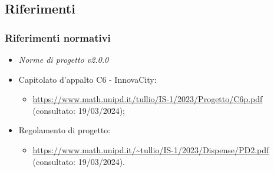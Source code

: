 \subsection{Riferimenti}

\subsubsection{Riferimenti normativi}
\begin{itemize}
    \item \textit{Norme di progetto v2.0.0}
    \item Capitolato d'appalto C6 - InnovaCity:
    \begin{itemize}
        \item \url{https://www.math.unipd.it/tullio/IS-1/2023/Progetto/C6p.pdf} (consultato: 19/03/2024);
    \end{itemize}
    \item Regolamento di progetto:
    \begin{itemize}
        \item \url{https://www.math.unipd.it/~tullio/IS-1/2023/Dispense/PD2.pdf} (consultato: 19/03/2024).
    \end{itemize}
\end{itemize}

